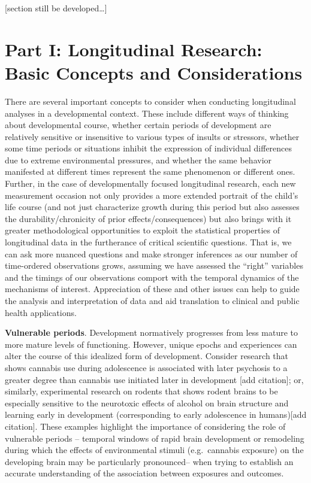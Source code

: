 \documentclass[
  10pt,
  letterpaper,
]{article}
\begin{document}
{[}section still be developed\ldots{]}

\hypertarget{part-i-longitudinal-research-basic-concepts-and-considerations}{%
\section{Part I: Longitudinal Research: Basic Concepts and
Considerations}\label{part-i-longitudinal-research-basic-concepts-and-considerations}}

\label{sec:headings} There are several important concepts to consider
when conducting longitudinal analyses in a developmental context. These
include different ways of thinking about developmental course, whether
certain periods of development are relatively sensitive or insensitive
to various types of insults or stressors, whether some time periods or
situations inhibit the expression of individual differences due to
extreme environmental pressures, and whether the same behavior
manifested at different times represent the same phenomenon or different
ones. Further, in the case of developmentally focused longitudinal
research, each new measurement occasion not only provides a more
extended portrait of the child's life course (and not just characterize
growth during this period but also assesses the durability/chronicity of
prior effects/consequences) but also brings with it greater
methodological opportunities to exploit the statistical properties of
longitudinal data in the furtherance of critical scientific questions.
That is, we can ask more nuanced questions and make stronger inferences
as our number of time-ordered observations grows, assuming we have
assessed the ``right'' variables and the timings of our observations
comport with the temporal dynamics of the mechanisms of interest.
Appreciation of these and other issues can help to guide the analysis
and interpretation of data and aid translation to clinical and public
health applications.

\textbf{Vulnerable periods}. Development normatively progresses from
less mature to more mature levels of functioning. However, unique epochs
and experiences can alter the course of this idealized form of
development. Consider research that shows cannabis use during
adolescence is associated with later psychosis to a greater degree than
cannabis use initiated later in development {[}add citation{]}; or,
similarly, experimental research on rodents that shows rodent brains to
be especially sensitive to the neurotoxic effects of alcohol on brain
structure and learning early in development (corresponding to early
adolescence in humans){[}add citation{]}. These examples highlight the
importance of considering the role of vulnerable periods -- temporal
windows of rapid brain development or remodeling during which the
effects of environmental stimuli (e.g.~cannabis exposure) on the
developing brain may be particularly pronounced-- when trying to
establish an accurate understanding of the association between exposures
and outcomes.
\end{document}
